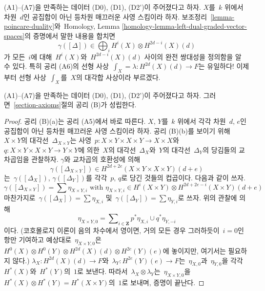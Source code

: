 \begin{remark}
\label{remark-trace}
(A1)--(A7)을 만족하는 데이터 (D0), (D1), (D2')이 주어졌다고 하자.
$X$를\  $k$ 위에서 차원\  $d$인 공집합이 아닌 등차원 매끄러운 사영
스킴이라 하자. 보조정리\  \ref{lemma-poincare-duality}와\  Homology,
Lemma \ref{homology-lemma-left-dual-graded-vector-spaces}의 증명에서
말한 내용을 합치면
$$
\gamma([\Delta]) \in \bigoplus\nolimits_i H^i(X) \otimes H^{2d - i}(X)(d)
$$
가 모든\  $i$에 대해\  $H^i(X)$와\  $H^{2d - i}(X)(d)$ 사이의 완전
쌍대성을 정의함을 알 수 있다. 특히 공리 (A6)의 선형 사상\ 
$\int_X = \lambda : H^{2d}(X)(d) \to F$는 유일하다! 이제부터 선형
사상\  $\int_X$를\  $X$의 대각합 사상이라 부르겠다.
\end{remark}

\begin{lemma}
\label{lemma-trace-product}
(A1)--(A7)을 만족하는 데이터 (D0), (D1), (D2')이 주어졌다고 하자.
그러면\  \ref{section-axioms}절의 공리 (B)가 성립한다.
\end{lemma}

\begin{proof}
공리 (B)(a)는 공리 (A5)에서 바로 따른다. $X$, $Y$를\  $k$ 위에서
각각 차원\  $d$, $e$인 공집합이 아닌 등차원 매끄러운 사영
스킴이라 하자. 공리 (B)(b)를 보이기 위해\  $X \times Y$의 대각선\ 
$\Delta_{X \times Y}$는 사영\ 
$p : X \times Y \times X \times Y \to X \times X$와\ 
$q : X \times Y \times X \times Y \to Y \times Y$에 의한\ 
$X$의 대각선\  $\Delta_X$와\  $Y$의 대각선\  $\Delta_Y$의 당김들의
교차곱임을 관찰하자. $\gamma$와 교차곱의 호환성에 의해
$$
\gamma([\Delta_{X \times Y}]) \in
H^{2d + 2e}(X \times Y \times X \times Y)(d + e)
$$
는\  $\gamma([\Delta_X])$, $\gamma([\Delta_Y])$를 각각\  $p$, $q$로
당긴 것들의 컵곱이다. 다음과 같이 쓰자.
$$
\gamma([\Delta_{X \times Y}]) = \sum \eta_{X \times Y, i}
\text{ with }
\eta_{X \times Y, i} \in
H^i(X \times Y) \otimes H^{2d + 2e - i}(X \times Y)(d + e)
$$
마찬가지로\  $\gamma([\Delta_X]) = \sum \eta_{X, i}$ 및\ 
$\gamma([\Delta_Y]) = \sum \eta_{Y, i}$로 쓰자. 위의 관찰에 의해
$$
\eta_{X \times Y, 0} =
\sum\nolimits_{i \in \mathbf{Z}} p^*\eta_{X, i} \cup q^*\eta_{Y, -i}
$$
이다. (코호몰로지 이론이 음의 차수에서 영이면, 거의 모든 경우
그러하듯이\  $i = 0$인 항만 기여하고 예상대로\ 
$\eta_{X \times Y, 0}$은\ 
$H^0(X) \otimes H^0(Y) \otimes H^{2d}(X)(d) \otimes H^{2e}(Y)(e)$에
놓이지만, 여기서는 필요하지 않다.)
$\lambda_X : H^{2d}(X)(d) \to F$와\ 
$\lambda_Y : H^{2e}(Y)(e) \to F$는\  $\eta_{X, 0}$과\ 
$\eta_{Y, 0}$을 각각\  $H^*(X)$와\  $H^*(Y)$의\  $1$로 보낸다.
따라서\  $\lambda_X \otimes \lambda_Y$는\  $\eta_{X \times Y, 0}$을\ 
$H^*(X) \otimes H^*(Y) = H^*(X \times Y)$의\  $1$로 보내며,
증명이 끝난다.
\end{proof}

